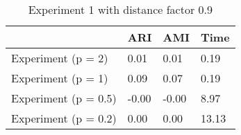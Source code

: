 \begin{table}
\centering
\caption{Experiment 1 with distance factor 0.9}
\begin{tabular}{llll}
\toprule
{} &    ARI &    AMI &   Time \\
\midrule
Experiment (p = 2)   &   0.01 &   0.01 &   0.19 \\
Experiment (p = 1)   &   0.09 &   0.07 &   0.19 \\
Experiment (p = 0.5) &  -0.00 &  -0.00 &   8.97 \\
Experiment (p = 0.2) &   0.00 &   0.00 &  13.13 \\
\bottomrule
\end{tabular}
\end{table}
